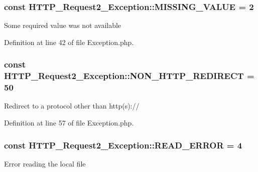 \subsubsection[{M\+I\+S\+S\+I\+N\+G\+\_\+\+V\+A\+L\+U\+E}]{\setlength{\rightskip}{0pt plus 5cm}const H\+T\+T\+P\+\_\+\+Request2\+\_\+\+Exception\+::\+M\+I\+S\+S\+I\+N\+G\+\_\+\+V\+A\+L\+U\+E = 2}\label{classHTTP__Request2__Exception_af25f90a5d31c28cfc9da9ea7b3b8fbb8}
Some required value was not available 

Definition at line 42 of file Exception.\+php.

\hypertarget{classHTTP__Request2__Exception_a9e2ad085db3df15cf825d54e14086b98}{}
\subsubsection[{N\+O\+N\+\_\+\+H\+T\+T\+P\+\_\+\+R\+E\+D\+I\+R\+E\+C\+T}]{\setlength{\rightskip}{0pt plus 5cm}const H\+T\+T\+P\+\_\+\+Request2\+\_\+\+Exception\+::\+N\+O\+N\+\_\+\+H\+T\+T\+P\+\_\+\+R\+E\+D\+I\+R\+E\+C\+T = 50}\label{classHTTP__Request2__Exception_a9e2ad085db3df15cf825d54e14086b98}
Redirect to a protocol other than http(s)\+:// 

Definition at line 57 of file Exception.\+php.

\hypertarget{classHTTP__Request2__Exception_a9167d1901f61ab9f5ec9271b41fe340e}{}
\subsubsection[{R\+E\+A\+D\+\_\+\+E\+R\+R\+O\+R}]{\setlength{\rightskip}{0pt plus 5cm}const H\+T\+T\+P\+\_\+\+Request2\+\_\+\+Exception\+::\+R\+E\+A\+D\+\_\+\+E\+R\+R\+O\+R = 4}\label{classHTTP__Request2__Exception_a9167d1901f61ab9f5ec9271b41fe340e}
Error reading the local file 

